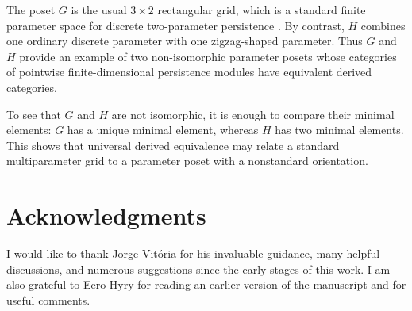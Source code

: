 \begin{example}
    The poset $G$ is the usual $3 \times 2$ rectangular grid, which is a standard finite parameter space for discrete two-parameter persistence \cite[Sections 2.2-2.3]{Botnan}. By contrast, $H$ combines one ordinary discrete parameter with one zigzag-shaped parameter. Thus $G$ and $H$ provide an example of two non-isomorphic parameter posets whose categories of pointwise finite-dimensional persistence modules have equivalent derived categories. 

    To see that $G$ and $H$ are not isomorphic, it is enough to compare their minimal elements: $G$ has a unique minimal element, whereas $H$ has two minimal elements. This shows that universal derived equivalence may relate a standard multiparameter grid to a parameter poset with a nonstandard orientation.

\end{example}

\section*{Acknowledgments}
I would like to thank Jorge Vitória for his invaluable guidance, many helpful discussions, and numerous suggestions since the early stages of this work. I am also grateful to Eero Hyry for reading an earlier version of the manuscript and for useful comments.